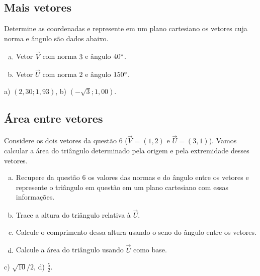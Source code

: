 \documentclass[main.tex]{subfiles}
\begin{document}
\subsection*{Mais vetores}

\begin{questao}
Determine as coordenadas e represente em um plano cartesiano os vetores cuja norma e ângulo são dados abaixo.
\begin{enumerate}[a)]
\item Vetor $\overrightarrow{V}$ com norma $3$ e ângulo $40\degree$.
\item Vetor $\overrightarrow{U}$ com norma $2$ e ângulo $150\degree$.
\end{enumerate}
\end{questao}

\begin{gabarito}
	\begin{gabaritoQuestao}
		a) $(2,30;1,93)$, b) $(-\sqrt{3};1,00)$.
	\end{gabaritoQuestao}
\end{gabarito}

\subsection*{Área entre vetores}

\begin{questao}
Considere os dois vetores da questão 6 ($\overrightarrow{V}=(1,2)$ e $\overrightarrow{U}=(3,1)$). Vamos calcular a área do triângulo determinado pela origem e pela extremidade desses vetores.
\begin{enumerate}[a)]
\item Recupere da questão 6 os valores das normas e do ângulo entre os vetores e represente o triângulo em questão em um plano cartesiano com essas informações.
\item Trace a altura do triângulo relativa à $\overrightarrow{U}$.
\item Calcule o comprimento dessa altura usando o seno do ângulo entre os vetores.
\item Calcule a área do triângulo usando $\overrightarrow{U}$ como base.
\end{enumerate}
\end{questao}

\begin{gabarito}
	\begin{gabaritoQuestao}
		c) $\sqrt{10}/2$, d) $\frac{5}{2}$.
	\end{gabaritoQuestao}
\end{gabarito}
\end{document}
